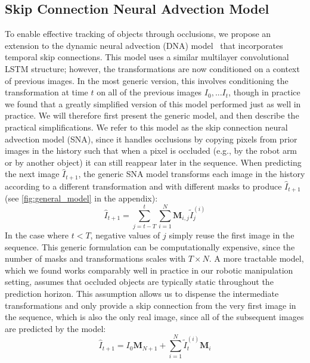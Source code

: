 \subsection{Skip Connection Neural Advection Model}
\label{sec:occlusion_model}
To enable effective tracking of objects through occlusions, we propose an extension to the dynamic neural advection (DNA) model~\cite{finn_nips} that incorporates temporal skip connections. This model uses a similar multilayer convolutional LSTM structure; however, the transformations are now conditioned on a context of previous images. In the most generic version, this involves conditioning the transformation at time $t$ on all of the previous images $I_0,...I_{t}$, though in practice we found that a greatly simplified version of this model performed just as well in practice. We will therefore first present the generic model, and then describe the practical simplifications. We refer to this model as the skip connection neural advection model (SNA), since it handles occlusions by copying pixels from prior images in the history such that when a pixel is occluded (e.g., by the robot arm or by another object) it can still reappear later in the sequence. When predicting the next image $\hat{I}_{t+1}$, the generic SNA model transforms each image in the history according to a different transformation and with different masks to produce $\hat{I}_{t+1}$ (see \autoref{fig:general_model} in the appendix):
\begin{equation}
\hat{I}_{t+1} =  \sum_{j=t-T}^{t} \sum_{i=1}^{N} \mathbf{M}_{i,j} \tilde{I}_{j}^{(i)}
\label{eqn:general_model}
\end{equation}
In the case where $t < T$, negative values of $j$ simply reuse the first image in the sequence. This generic formulation can be computationally expensive, since the number of masks and transformations scales with $T \times N$. A more tractable model, which we found works comparably well in practice in our robotic manipulation setting, assumes that occluded objects are typically static throughout the prediction horizon. This assumption allows us to dispense the intermediate transformations and only provide a skip connection from the very first image in the sequence, which is also the only real image, since all of the subsequent images are predicted by the model:
\begin{equation}
\hat{I}_{t+1} =  I_0 \mathbf{M}_{N+1} +  \sum_{i=1}^{N} \tilde{I}_t^{(i)} \mathbf{M}_i
\label{eqn:simplemodel}
\end{equation}
